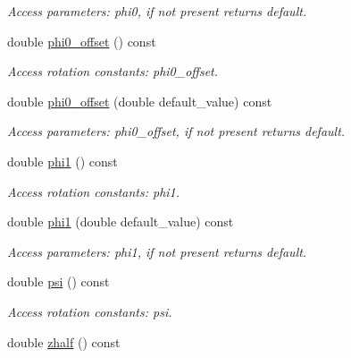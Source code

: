 \begin{DoxyCompactItemize}
\begin{DoxyCompactList}\small\item\em Access parameters: phi0, if not present returns default. \item\end{DoxyCompactList}\item 
double \hyperlink{struct_d_d4hep_1_1_x_m_l_1_1_child_value_ae26b7e2af1bf644950346f2d52d37578}{phi0\_\-offset} () const 
\begin{DoxyCompactList}\small\item\em Access rotation constants: phi0\_\-offset. \item\end{DoxyCompactList}\item 
double \hyperlink{struct_d_d4hep_1_1_x_m_l_1_1_child_value_afe926d4307e54d8193b04a0f6589d424}{phi0\_\-offset} (double default\_\-value) const 
\begin{DoxyCompactList}\small\item\em Access parameters: phi0\_\-offset, if not present returns default. \item\end{DoxyCompactList}\item 
double \hyperlink{struct_d_d4hep_1_1_x_m_l_1_1_child_value_aa2a8fb87222bd7d6517a657622f9cbc4}{phi1} () const 
\begin{DoxyCompactList}\small\item\em Access rotation constants: phi1. \item\end{DoxyCompactList}\item 
double \hyperlink{struct_d_d4hep_1_1_x_m_l_1_1_child_value_af8036a9f65c386ce0980839388531211}{phi1} (double default\_\-value) const 
\begin{DoxyCompactList}\small\item\em Access parameters: phi1, if not present returns default. \item\end{DoxyCompactList}\item 
double \hyperlink{struct_d_d4hep_1_1_x_m_l_1_1_child_value_aa2a4dc3fe1286cb4e30a68a6b7bec941}{psi} () const 
\begin{DoxyCompactList}\small\item\em Access rotation constants: psi. \item\end{DoxyCompactList}\item 
double \hyperlink{struct_d_d4hep_1_1_x_m_l_1_1_child_value_ac41a817524ba5fa00eab5c6099d07cdc}{zhalf} () const 

\end{DoxyCompactItemize}
